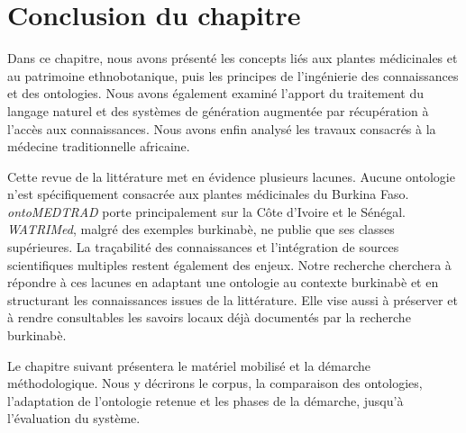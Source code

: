 \section*{Conclusion du chapitre}

Dans ce chapitre, nous avons présenté les concepts liés aux plantes médicinales et au patrimoine ethnobotanique, puis les principes de l'ingénierie des connaissances et des ontologies. Nous avons également examiné l'apport du traitement du langage naturel et des systèmes de génération augmentée par récupération à l'accès aux connaissances. Nous avons enfin analysé les travaux consacrés à la médecine traditionnelle africaine.

Cette revue de la littérature met en évidence plusieurs lacunes. Aucune ontologie n'est spécifiquement consacrée aux plantes médicinales du Burkina Faso. \textit{ontoMEDTRAD} porte principalement sur la Côte d'Ivoire et le Sénégal. \textit{WATRIMed}, malgré des exemples burkinabè, ne publie que ses classes supérieures. La traçabilité des connaissances et l'intégration de sources scientifiques multiples restent également des enjeux. Notre recherche cherchera à répondre à ces lacunes en adaptant une ontologie au contexte burkinabè et en structurant les connaissances issues de la littérature. Elle vise aussi à préserver et à rendre consultables les savoirs locaux déjà documentés par la recherche burkinabè.

Le chapitre suivant présentera le matériel mobilisé et la démarche méthodologique. Nous y décrirons le corpus, la comparaison des ontologies, l'adaptation de l'ontologie retenue et les phases de la démarche, jusqu'à l'évaluation du système.
